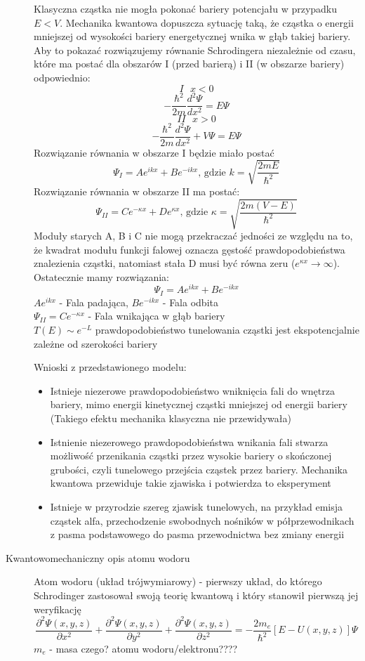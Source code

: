 \documentclass[a4paper,11pt]{article}
\begin{document}
\begin{description}
  Klasyczna cząstka nie mogła pokonać bariery potencjału w przypadku $E<V$. Mechanika kwantowa dopuszcza sytuację taką, że cząstka o energii mniejszej od wysokości bariery energetycznej wnika w głąb takiej bariery. Aby to pokazać rozwiązujemy równanie Schrodingera niezależnie od czasu, które ma postać dla obszarów I (przed barierą) i II (w obszarze bariery) odpowiednio:
  $$I\text{     }x<0$$
  $$-\frac{\hbar^2}{2m}\frac{d^2\Psi}{dx^2}=E\Psi$$
  $$II\text{     }x>0$$
  $$-\frac{\hbar^2}{2m}\frac{d^2\Psi}{dx^2}+V\Psi=E\Psi$$
  Rozwiązanie równania w obszarze I będzie miało postać
  $$\Psi_I = Ae^{ikx}+Be^{-ikx}\text{, gdzie }k=\sqrt{\frac{2mE}{\hbar^2}}$$
  Rozwiązanie równania w obszarze II ma postać:
  $$\Psi_{II}=Ce^{-\kappa x}+De^{\kappa x}\text{, gdzie }\kappa=\sqrt{\frac{2m\left(V-E\right)}{\hbar^2}}$$
  Moduły starych A, B i C nie mogą przekraczać jedności ze względu na to, że kwadrat modułu funkcji falowej oznacza gęstość prawdopodobieństwa znalezienia cząstki, natomiast stała D musi być równa zeru ($e^{\kappa x}\longrightarrow \infty$). Ostatecznie mamy rozwiązania:
  $$\Psi_I=Ae^{ikx}+Be^{-ikx}$$
  $Ae^{ikx}$ - Fala padająca, $Be^{-ikx}$ - Fala odbita\\
  $\Psi_{II}=Ce^{-\kappa x}$ - Fala wnikająca w głąb bariery\\
  $T(E)\sim e^{-L}$ prawdopodobieństwo tunelowania cząstki jest ekspotencjalnie zależne od szerokości bariery

  Wnioski z przedstawionego modelu:
  \begin{itemize}
  \item Istnieje niezerowe prawdopodobieństwo wniknięcia fali do wnętrza bariery, mimo energii kinetycznej cząstki mniejszej od energii bariery (Takiego efektu mechanika klasyczna nie przewidywała)
  \item Istnienie niezerowego prawdopodobieństwa wnikania fali stwarza możliwość przenikania cząstki przez wysokie bariery o skończonej grubości, czyli tunelowego przejścia cząstek przez bariery. Mechanika kwantowa przewiduje takie zjawiska i potwierdza to eksperyment
  \item Istnieje w przyrodzie szereg zjawisk tunelowych, na przykład emisja cząstek alfa, przechodzenie swobodnych nośników w półprzewodnikach z pasma podstawowego do pasma przewodnictwa bez zmiany energii
  \end{itemize}
\item[Kwantowomechaniczny opis atomu wodoru] Atom wodoru (układ trójwymiarowy) - pierwszy układ, do którego Schrodinger zastosował swoją teorię kwantową i który stanowił pierwszą jej weryfikację
  $$\frac{\partial^2\Psi(x,y,z)}{\partial x^2}+\frac{\partial^2\Psi(x,y,z)}{\partial y^2}+\frac{\partial^2\Psi(x,y,z)}{\partial z^2}=-\frac{2m_e}{\hbar^2}\left[E-U(x,y,z)\right]\Psi$$
  $m_e$ - masa czego? atomu wodoru/elektronu????


\end{description}
\end{document}

